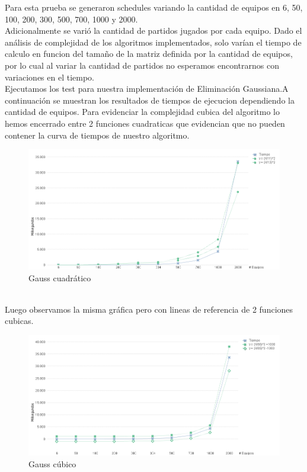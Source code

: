 Para esta prueba se generaron schedules variando la cantidad de equipos en 6, 50, 100, 200, 300, 500, 700, 1000 y 2000. \\

Adicionalmente se varió la cantidad de partidos jugados por cada equipo. Dado el análisis de complejidad de los algoritmos implementados, solo varían el tiempo de calculo en funcion del tamaño de la matriz definida por la cantidad de equipos, por lo cual al variar la cantidad de partidos no esperamos encontrarnos con variaciones en el tiempo. \\

Ejecutamos los test para nuestra implementación de Eliminación Gaussiana.A continuación se muestran los resultados de tiempos de ejecucion dependiendo la cantidad de equipos. Para evidenciar la complejidad cubica del algoritmo lo hemos encerrado entre 2 funciones cuadraticas que evidencian que no pueden contener la curva de tiempos de nuestro algoritmo. \\


\begin{figure}[H]
\centering
\includegraphics[width=1\textwidth]{IMG/gauss cuadrativo.png}
\caption{Gauss cuadrático}
\label{fig:Gauss cuadrático}
\end{figure}

\\

Luego observamos la misma gráfica pero con lineas de referencia de 2 funciones cubicas. \\

\begin{figure}[H]
\centering
\includegraphics[width=1\textwidth]{IMG/gauss cubico.png}
\caption{Gauss cúbico}
\label{fig:Gauss cúbico}
\end{figure}

